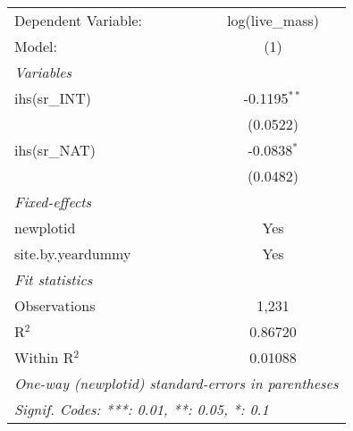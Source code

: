 \begin{tabular}{lc}
\tabularnewline\midrule\midrule
Dependent Variable:&log(live\_mass)\\
Model:&(1)\\
\midrule \emph{Variables}&  \\
ihs(sr\_INT)&-0.1195$^{**}$\\
  &(0.0522)\\
ihs(sr\_NAT)&-0.0838$^{*}$\\
  &(0.0482)\\
\midrule \emph{Fixed-effects}&  \\
newplotid & Yes\\
site.by.yeardummy & Yes\\
\midrule \emph{Fit statistics}&  \\
Observations & 1,231\\
R$^2$ & 0.86720\\
Within R$^2$ & 0.01088\\
\midrule\midrule\multicolumn{2}{l}{\emph{One-way (newplotid) standard-errors in parentheses}}\\
\multicolumn{2}{l}{\emph{Signif. Codes: ***: 0.01, **: 0.05, *: 0.1}}\\
\end{tabular}


